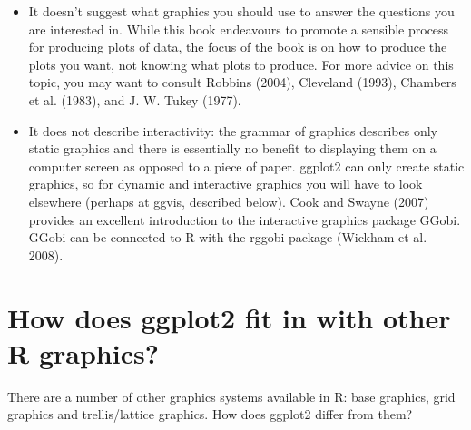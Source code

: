 \begin{itemize}
\item
  It doesn't suggest what graphics you should use to answer the
  questions you are interested in. While this book endeavours to promote
  a sensible process for producing plots of data, the focus of the book
  is on how to produce the plots you want, not knowing what plots to
  produce. For more advice on this topic, you may want to consult
  Robbins (2004), Cleveland (1993), Chambers et al. (1983), and J. W.
  Tukey (1977).
\item
  It does not describe interactivity: the grammar of graphics describes
  only static graphics and there is essentially no benefit to displaying
  them on a computer screen as opposed to a piece of paper. ggplot2 can
  only create static graphics, so for dynamic and interactive graphics
  you will have to look elsewhere (perhaps at ggvis, described below).
  Cook and Swayne (2007) provides an excellent introduction to the
  interactive graphics package GGobi. GGobi can be connected to R with
  the rggobi package (Wickham et al. 2008).
\end{itemize}

\section{How does ggplot2 fit in with other R graphics?}

There are a number of other graphics systems available in R: base
graphics, grid graphics and trellis/lattice graphics. How does ggplot2
differ from them?

